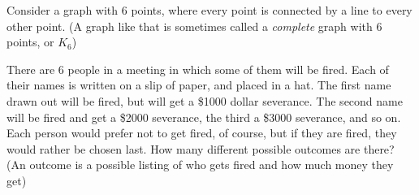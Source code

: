 \documentclass[addpoints, 12pt]{exam}
\begin{document}
\begin{questions}
\question Consider a graph with $6$ points, where every point is connected by a line to every other point.  (A graph like that is sometimes called a \emph{complete} graph with 6 points, or $K_6$)
 
\question There are $6$ people in a meeting in which some of them will be fired.  Each of their names is written on a slip of paper, and placed in a hat.  The first name drawn out will be fired, but will get a \$1000 dollar severance.  The second name will be fired and get a \$2000 severance, the third a \$3000 severance, and so on.  Each person would prefer not to get fired, of course, but if they are fired, they would rather be chosen last.  How many different possible outcomes are there?  (An outcome is a possible listing of who gets fired and how much money they get)

\end{questions}
\end{document}
